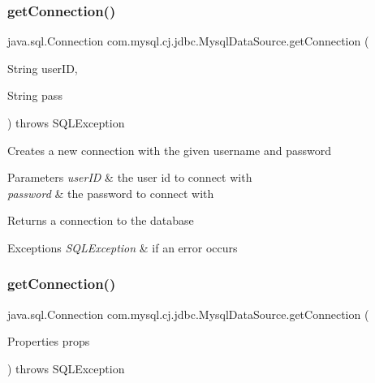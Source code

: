 \subsubsection{\texorpdfstring{get\+Connection()}{getConnection()}\hspace{0.1cm}{\footnotesize\ttfamily [2/3]}}
{\footnotesize\ttfamily java.\+sql.\+Connection com.\+mysql.\+cj.\+jdbc.\+Mysql\+Data\+Source.\+get\+Connection (\begin{DoxyParamCaption}\item[{String}]{user\+ID,  }\item[{String}]{pass }\end{DoxyParamCaption}) throws S\+Q\+L\+Exception}

Creates a new connection with the given username and password


\begin{DoxyParams}{Parameters}
{\em user\+ID} & the user id to connect with \\
\hline
{\em password} & the password to connect with\\
\hline
\end{DoxyParams}
\begin{DoxyReturn}{Returns}
a connection to the database
\end{DoxyReturn}

\begin{DoxyExceptions}{Exceptions}
{\em S\+Q\+L\+Exception} & if an error occurs \\
\hline
\end{DoxyExceptions}
\mbox{\label{classcom_1_1mysql_1_1cj_1_1jdbc_1_1_mysql_data_source_a914987783b972cea698bea74567fb862}} 
\subsubsection{\texorpdfstring{get\+Connection()}{getConnection()}\hspace{0.1cm}{\footnotesize\ttfamily [3/3]}}
{\footnotesize\ttfamily java.\+sql.\+Connection com.\+mysql.\+cj.\+jdbc.\+Mysql\+Data\+Source.\+get\+Connection (\begin{DoxyParamCaption}\item[{Properties}]{props }\end{DoxyParamCaption}) throws S\+Q\+L\+Exception\hspace{0.3cm}{\ttfamily [protected]}}

